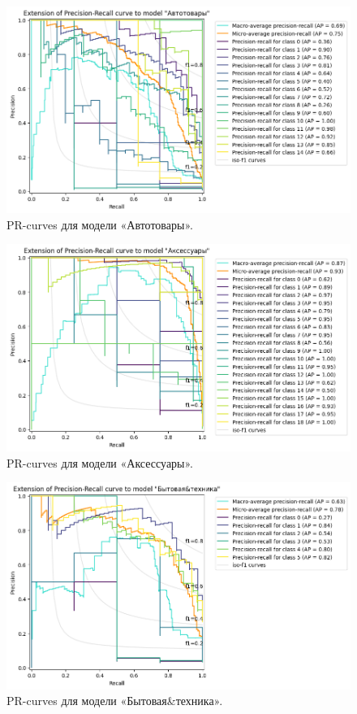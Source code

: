 \documentclass[a4paper,12pt]{extarticle}
\begin{document}
\begin{figure}[hbtp]
	\centering
	\includegraphics[scale=0.7]{pr_curves/prcurve_Автотовары.png}
	\caption{PR-curves для модели «Автотовары».}
	\label{fig:prcurve_Автотовары}
\end{figure}

\begin{figure}[hbtp]
	\centering
	\includegraphics[scale=0.7]{pr_curves/prcurve_Аксессуары.png}
	\caption{PR-curves для модели «Аксессуары».}
	\label{fig:prcurve_Аксессуары}
\end{figure}

\begin{figure}[hbtp]
	\centering
	\includegraphics[scale=0.7]{pr_curves/prcurve_Бытовая&техника.png}
	\caption{PR-curves для модели «Бытовая\&техника».}
	\label{fig:prcurve_Бытовая&техника}
\end{figure}
\end{document}

